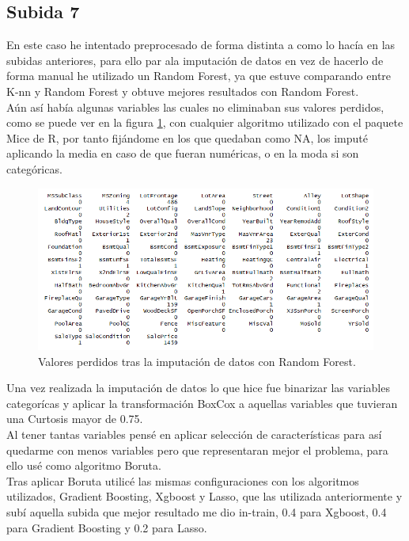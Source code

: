 \documentclass[14pt]{extarticle}
\begin{document}
\subsection{Subida 7}

En este caso he intentado preprocesado de forma distinta a como lo hacía en las subidas anteriores, para ello par ala imputación de datos en vez de hacerlo de forma manual he utilizado un Random Forest, ya que estuve comparando entre K-nn y Random Forest y obtuve mejores resultados con Random Forest. \\

Aún así había algunas variables las cuales no eliminaban sus valores perdidos, como se puede ver en la figura \ref{im5}, con cualquier algoritmo utilizado con el paquete Mice de R, por tanto fijándome en los que quedaban como NA, los imputé aplicando la media en caso de que fueran numéricas, o en la moda si son categóricas. \\

\begin{figure}[h!]
	\centering
	\includegraphics[width=15cm]{img/nassecpre.png}
	\caption{Valores perdidos tras la imputación de datos con Random Forest.}
	\label{im5}
\end{figure}

Una vez realizada la imputación de datos lo que hice fue binarizar las variables categorícas y aplicar la transformación BoxCox a aquellas variables que tuvieran una Curtosis mayor de 0.75. \\

Al tener tantas variables pensé en aplicar selección de características para así quedarme con menos variables pero que representaran mejor el problema, para ello usé como algoritmo Boruta. \\

Tras aplicar Boruta utilicé las mismas configuraciones con los algoritmos utilizados, Gradient Boosting, Xgboost y Lasso, que las utilizada anteriormente y subí aquella subida que mejor resultado me dio in-train, 0.4 para Xgboost, 0.4 para Gradient Boosting y 0.2 para Lasso. \\
\end{document}

